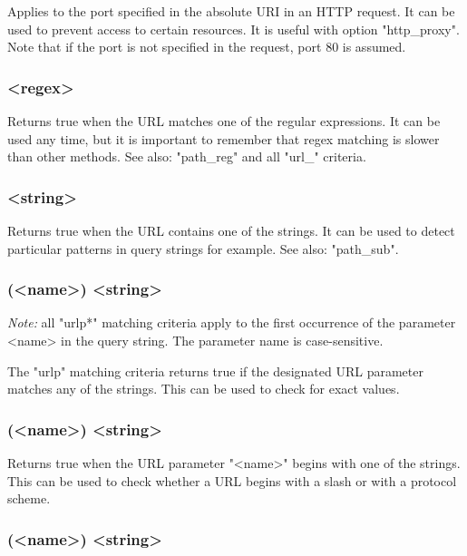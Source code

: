  Applies to the port specified in the absolute URI in an HTTP request. It can
  be used to prevent access to certain resources. It is useful with option
  "http\_proxy". Note that if the port is not specified in the request, port 80
  is assumed.

\subsubsection[url\_reg]{ <regex>}

  Returns true when the URL matches one of the regular expressions. It can be
  used any time, but it is important to remember that regex matching is slower
  than other methods. See also: "path\_reg" and all "url\_" criteria.

\subsubsection[url\_sub]{ <string>}

  Returns true when the URL contains one of the strings. It can be used to
  detect particular patterns in query strings for example. See also: "path\_sub".

\subsubsection[urlp]{(<name>) <string>}

  \emph{Note:} all "urlp*" matching criteria apply to the first occurrence of the
  parameter <name> in the query string. The parameter name is case-sensitive.

  The "urlp" matching criteria returns true if the designated URL parameter
  matches any of the strings. This can be used to check for exact values.

\subsubsection[urlp\_beg]{(<name>) <string>}

  Returns true when the URL parameter "<name>" begins with one of the strings.
  This can be used to check whether a URL begins with a slash or with a
  protocol scheme.

\subsubsection[urlp\_dir]{(<name>) <string>}

